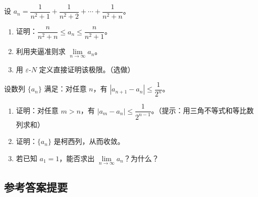 \documentclass[fontset=fandol]{ctexart}
\begin{document}
\begin{exercise}
设 \(a_n = \dfrac{1}{n^2 + 1} + \dfrac{1}{n^2 + 2} + \cdots + \dfrac{1}{n^2 + n}\)。
\begin{enumerate}
\item 证明：\(\dfrac{n}{n^2 + n} \leq a_n \leq \dfrac{n}{n^2 + 1}\)。
\item 利用夹逼准则求 \(\lim\limits_{n\to\infty} a_n\)。
\item 用 \(\varepsilon\)-\(N\) 定义直接证明该极限。（选做）
\end{enumerate}
\end{exercise}

\begin{exercise}[*（柯西收敛准则）]
设数列 \(\{a_n\}\) 满足：对任意 \(n\)，有 \(|a_{n+1} - a_n| \leq \dfrac{1}{2^n}\)。
\begin{enumerate}
\item 证明：对任意 \(m > n\)，有 \(|a_m - a_n| \leq \dfrac{1}{2^{n-1}}\)。（提示：用三角不等式和等比数列求和）
\item 证明：\(\{a_n\}\) 是柯西列，从而收敛。
\item 若已知 \(a_1 = 1\)，能否求出 \(\lim\limits_{n\to\infty} a_n\)？为什么？
\end{enumerate}
\end{exercise}


\subsection*{参考答案提要}
\end{document}
